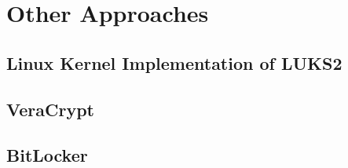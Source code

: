 \section{Other Approaches}
\label{chap:otherapproaches}

\subsection{Linux Kernel Implementation of LUKS2}
\label{chap:otherapproaches.linux}

\subsection{VeraCrypt}
\label{chap:otherapproaches.veracrypt}

\subsection{BitLocker}
\label{chap:otherapproaches.bitlocker}
